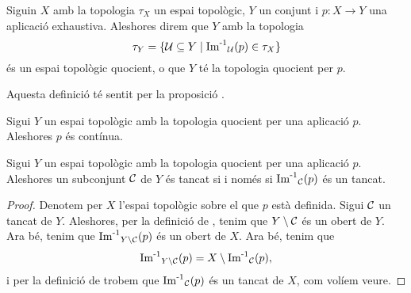 \documentclass[../../Main.tex]{subfiles}
\begin{document}
	\begin{definition}
		\label{def:topologia quocient}
		Siguin \(X\) amb la topologia \(\tau_{X}\) un espai topològic, \(Y\) un conjunt i \(p\colon X\longrightarrow Y\) una aplicació exhaustiva. Aleshores direm que \(Y\) amb la topologia
		\[
		    \tau_{Y}=\{\mathcal{U}\subseteq Y\mid\operatorname{\operatorname{Im}^{-1}}_{\mathcal{U}}(p)\in\tau_{X}\}
		\]
		és un espai topològic quocient, o que \(Y\) té la topologia quocient per \(p\).
		
		Aquesta definició té sentit per la proposició .
	\end{definition}
	\begin{observation}
		\label{obs:l'aplicació que indueix la topologia en un espai quocient és contínua}
		Sigui \(Y\) un espai topològic amb la topologia quocient per una aplicació \(p\). Aleshores \(p\) és contínua.
	\end{observation} %
	\begin{proposition}
		\label{prop:la topologia quocient és equivalent per tancats}
		Sigui \(Y\) un espai topològic amb la topologia quocient per una aplicació \(p\). Aleshores un subconjunt \(\mathcal{C}\) de \(Y\) és tancat si i només si \(\operatorname{\operatorname{Im}^{-1}}_{\mathcal{C}}(p)\) és un tancat.
		\begin{proof} %
			Denotem per \(X\) l'espai topològic sobre el que \(p\) està definida. Sigui \(\mathcal{C}\) un tancat de \(Y\). Aleshores, per la definició de , tenim que \(Y\setminus\mathcal{C}\) és un obert de \(Y\). Ara bé, tenim que \(\operatorname{\operatorname{Im}^{-1}}_{Y\setminus\mathcal{C}}(p)\) és un obert de \(X\). Ara bé, tenim que
			\[
			    \operatorname{\operatorname{Im}^{-1}}_{Y\setminus\mathcal{C}}(p)=X\setminus\operatorname{\operatorname{Im}^{-1}}_{\mathcal{C}}(p),
			\]
			i per la definició de  trobem que \(\operatorname{\operatorname{Im}^{-1}}_{\mathcal{C}}(p)\) és un tancat de \(X\), com volíem veure.
		\end{proof}
	\end{proposition}
\end{document}
